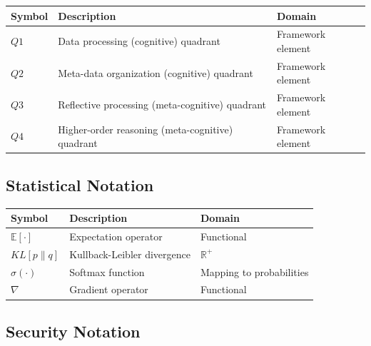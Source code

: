 \documentclass[
]{article}
\newcounter{none} %
\begin{document}
{\def\LTcaptype{none} %
\begin{longtable}[]{@{}
  >{\raggedright\arraybackslash}p{}
  >{\raggedright\arraybackslash}p{}
  >{\raggedright\arraybackslash}p{}@{}}
\toprule\noalign{}
\begin{minipage}[b]{\linewidth}\raggedright
Symbol
\end{minipage} & \begin{minipage}[b]{\linewidth}\raggedright
Description
\end{minipage} & \begin{minipage}[b]{\linewidth}\raggedright
Domain
\end{minipage} \\
\midrule\noalign{}
\endhead
\bottomrule\noalign{}
\endlastfoot
\(Q1\) & Data processing (cognitive) quadrant & Framework element \\
\(Q2\) & Meta-data organization (cognitive) quadrant & Framework
element \\
\(Q3\) & Reflective processing (meta-cognitive) quadrant & Framework
element \\
\(Q4\) & Higher-order reasoning (meta-cognitive) quadrant & Framework
element \\
\end{longtable}
}

\subsection{Statistical Notation}\label{statistical-notation}

{\def\LTcaptype{none} %
\begin{longtable}[]{@{}lll@{}}
\toprule\noalign{}
Symbol & Description & Domain \\
\midrule\noalign{}
\endhead
\bottomrule\noalign{}
\endlastfoot
\(\mathbb{E}[\cdot]\) & Expectation operator & Functional \\
\(KL[p\|q]\) & Kullback-Leibler divergence & \(\mathbb{R}^+\) \\
\(\sigma(\cdot)\) & Softmax function & Mapping to probabilities \\
\(\nabla\) & Gradient operator & Functional \\
\end{longtable}
}

\subsection{Security Notation}\label{security-notation}
\end{document}
